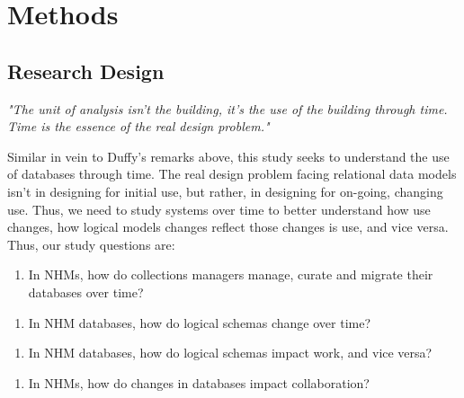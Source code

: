 \section{Methods}

\subsection{Research Design}
\textit{"The unit of analysis isn't the building, it's the use of the building through time. Time is the essence of the real design problem."}\cite{duffy1990measuring}

Similar in vein to Duffy's remarks above, this study seeks to understand the use of databases through time. The real design problem facing relational data models isn't in designing for initial use, but rather, in designing for on-going, changing use.  Thus, we need to study systems over time to better understand how use changes, how logical models changes reflect those changes is use, and vice versa.  Thus, our study questions are:
\begin{enumerate}
\item In NHMs, how do collections managers manage, curate and migrate their databases over time?
\end{enumerate}
\begin{enumerate}
\item In NHM databases, how do logical schemas change over time?
\end{enumerate}
\begin{enumerate}
\item In NHM databases, how do logical schemas impact work, and vice versa?
\end{enumerate}
\begin{enumerate}
\item In NHMs, how do changes in databases impact collaboration?
\end{enumerate}


